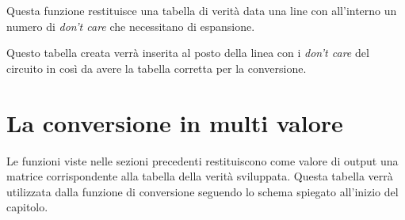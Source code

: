 \documentclass[
  italian,
]{book}
\begin{document}
Questa funzione restituisce una tabella di verità data una line con all'interno un numero di \emph{don't care} che necessitano di espansione.

Questo tabella creata verrà inserita al posto della linea con i \emph{don't care} del circuito in così da avere la tabella corretta per la conversione.

\newpage

\hypertarget{la-conversione-in-multi-valore}{%
\section{La conversione in multi valore}\label{la-conversione-in-multi-valore}}

Le funzioni viste nelle sezioni precedenti restituiscono come valore di output una matrice corrispondente alla tabella della verità sviluppata. Questa tabella verrà utilizzata dalla funzione di conversione seguendo lo schema spiegato all'inizio del capitolo.
\end{document}
